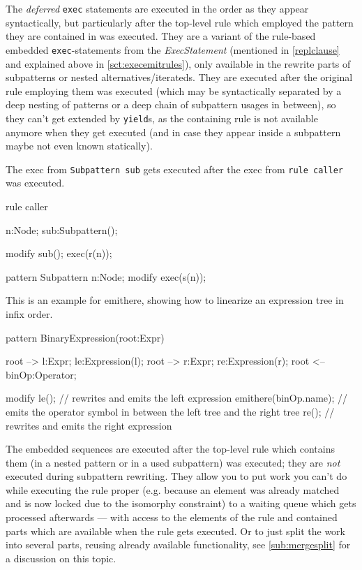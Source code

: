 The \emph{deferred} \texttt{exec} statements are executed in the order as they appear syntactically, but particularly after the top-level rule which employed the pattern they are contained in was executed.
They are a variant of the rule-based embedded \texttt{exec}-statements from the \emph{ExecStatement} (mentioned in \ref{replclause} and explained above in \ref{sct:execemitrules}), only available in the rewrite parts of subpatterns or nested alternatives/iterateds.
They are executed after the original rule employing them was executed (which may be syntactically separated by a deep nesting of patterns or a deep chain of subpattern usages in between),
so they can't get extended by \texttt{yield}s,
as the containing rule is not available anymore when they get executed (and in case they appear inside a subpattern maybe not even known statically).

\begin{example}
	The exec from \texttt{Subpattern sub} gets executed after the exec from \texttt{rule caller} was executed.
	\begin{grgen}
rule caller
{
  n:Node;
  sub:Subpattern();

  modify {
    sub();
    exec(r(n));
  }
}
pattern Subpattern
{
  n:Node;
  modify {
    exec(s(n));
  }
}
	\end{grgen}
\end{example}

\begin{example}
	This is an example for emithere, showing how to linearize an expression tree in infix order.
	\begin{grgen}
pattern BinaryExpression(root:Expr)
{
  root --> l:Expr; le:Expression(l);
  root --> r:Expr; re:Expression(r);
  root <-- binOp:Operator;

  modify {
    le(); // rewrites and emits the left expression
    emithere(binOp.name); // emits the operator symbol in between the left tree and the right tree
    re(); // rewrites and emits the right expression
  }
}
	\end{grgen}
\end{example}

\begin{note}
The embedded sequences are executed after the top-level rule which contains them (in a nested pattern or in a used subpattern) was executed; they are \emph{not} executed during subpattern rewriting.
They allow you to put work you can't do while executing the rule proper (e.g. because an element was already matched and is now locked due to the isomorphy constraint) to a waiting queue which gets processed afterwards --- with access to the elements of the rule and contained parts which are available when the rule gets executed.
Or to just split the work into several parts, reusing already available functionality, see \ref{sub:mergesplit} for a discussion on this topic.
\end{note}

